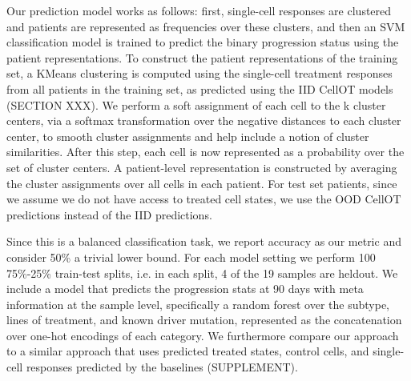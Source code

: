 Our prediction model works as follows: first, single-cell responses are clustered and patients are represented as frequencies over these clusters, and then an SVM classification model is trained to predict the binary progression status using the patient representations. To construct the patient representations of the training set, a KMeans clustering is computed using the single-cell treatment responses from all patients in the training set, as predicted using the IID CellOT models (SECTION XXX). We perform a soft assignment of each cell to the k cluster centers, via a softmax transformation over the negative distances to each cluster center, to smooth cluster assignments and help include a notion of cluster similarities. After this step, each cell is now represented as a probability over the set of cluster centers. A patient-level representation is constructed by averaging the cluster assignments over all cells in each patient. For test set patients, since we assume we do not have access to treated cell states, we use the OOD CellOT predictions instead of the IID predictions. 

Since this is a balanced classification task, we report accuracy as our metric and consider 50\% a trivial lower bound. For each model setting we perform 100 75\%-25\% train-test splits, i.e. in each split, 4 of the 19 samples are heldout. We include a model that predicts the progression stats at 90 days with meta information at the sample level, specifically a random forest over the subtype, lines of treatment, and known driver mutation, represented as the concatenation over one-hot encodings of each category. We furthermore compare our approach to a similar approach that uses predicted treated states, control cells, and single-cell responses predicted by the baselines (SUPPLEMENT).
